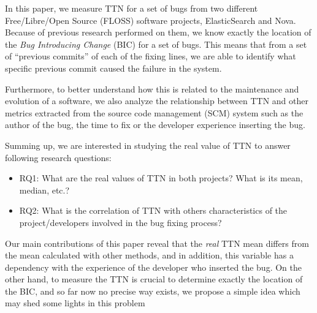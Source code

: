 \documentclass[10pt, conference]{IEEEtran}
\begin{document}

In this paper, we measure TTN for a set of bugs from two different Free/Libre/Open Source (FLOSS) software projects, ElasticSearch and Nova. Because of previous research performed on them, we know exactly the location of the \emph{Bug Introducing Change} (BIC) for a set of bugs. This means that from a set of ``previous commits'' of each of the fixing lines, we are able to identify what specific previous commit caused the failure in the system.

Furthermore, to better understand how this is related to the maintenance and evolution of a software, we also analyze the relationship between TTN and other metrics extracted from the source code management (SCM) system such as the author of the bug, the time to fix or the developer experience inserting the bug.



Summing up, we are interested in studying the real value of TTN to answer following research questions:
\begin{itemize}
\item RQ1: What are the real values of TTN in both projects? What is its mean, median, etc.?
\item RQ2: What is the correlation of TTN with others characteristics of the project/developers involved in the bug fixing process? 
\end{itemize}
Our main contributions of this paper reveal that the \emph{real} TTN mean differs from the mean calculated with other methods, and in addition, this variable has a dependency with the experience of the developer who inserted the bug. On the other hand, to measure the TTN is crucial to determine exactly the location of the BIC, and so far now no precise way exists, we propose a simple idea which may shed some lights in this problem
\end{document}
